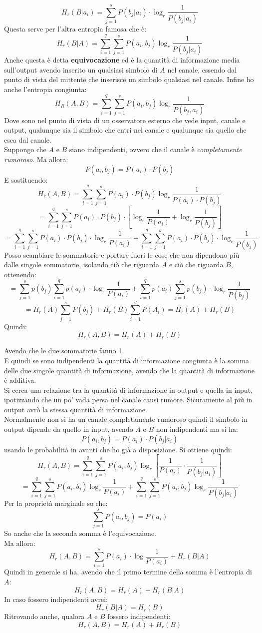 \documentclass[a4paper,12pt, oneside]{book}
\begin{document}
\[H_r(B|a_i)=\sum_{j=1}^s P(b_j|a_i)\cdot \log_r\frac{1}{P(b_j|a_i)}\]
Questa serve per l'altra entropia famosa che è:
\[H_r(B|A)=\sum_{i=1}^q\sum_{j=1}^s P(a_i,b_j)\log_r\frac{1}{P(b_j|a_i)}\]
Anche questa è detta \textbf{equivocazione} ed è la quantità di informazione
media sull'output avendo inserito un qualsiasi simbolo di $A$ nel canale,
essendo dal punto di vista del mittente che inserisce un simbolo qualsiasi nel
canale. 
Infine ho anche l'entropia congiunta:
\[H_R(A,B)=\sum_{i=1}^q\sum_{j=1}^s P(a_i,b_j)\log_r\frac{1}{P(b_j,a_i)}\]
Dove sono nel punto di vista di un osservatore esterno che vede input, canale e
output, qualunque sia il simbolo che entri nel canale e qualunque sia quello che
esca dal canale. \\
Suppongo che $A$ e $B$ siano indipendenti, ovvero che il canale è
\textit{completamente rumoroso}. Ma allora: 
\[P(a_i,b_j)=P(a_i)\cdot P(b_j)\]
E sostituendo:
\[H_r(A,B)=\sum_{i=1}^q\sum_{j=1}^s P(a_i)\cdot
  P(b_j)\log_r\frac{1}{P(a_i)\cdot P(b_j)}\]
\[=\sum_{i=1}^q\sum_{j=1}^s P(a_i)\cdot
  P(b_j)\cdot \left[\log_r\frac{1}{P(a_i)}+\log_r\frac{1}{P(b_j)}\right]\]
\[=\sum_{i=1}^q\sum_{j=1}^s P(a_i)\cdot
  P(b_j)\cdot \log_r\frac{1}{P(a_i)}+\sum_{i=1}^q\sum_{j=1}^s P(a_i)\cdot
  P(b_j)\cdot \log_r\frac{1}{P(b_j)}\]
Posso scambiare le sommatorie e portare fuori le cose che non dipendono più
dalle singole sommatorie, isolando ciò che riguarda $A$ e ciò che riguarda $B$,
ottenendo: 
\[=\sum_{j=1}^sp(b_j)\sum_{i=1}^qp(a_i)\cdot
  \log_r\frac{1}{P(a_i)}+\sum_{i=1}^qp(a_i)\sum_{j=1}^sp(b_j)\cdot
  \log_r\frac{1}{P(b_j)}\]
\[=H_r(A)\sum_{j=1}^sP(b_j)+H_r(B)\sum_{i=1}^qP(A_i)=H_r(A)+H_r(B)\]
Quindi:
\[H_r(A,B)=H_r(A)+H_r(B)\]

Avendo che le due sommatorie fanno 1.\\
E quindi se sono indipendenti la quantità di informazione congiunta è la somma
delle due singole quantità di informazione, avendo che la quantità di
informazione è additiva.\\
Si cerca una relazione tra la quantità di informazione in output e quella in
input, ipotizzando che un po' vada persa nel canale causi rumore. Sicuramente al
più in output avrò la stessa quantità di informazione. \\
Normalmente non si ha un canale completamente rumoroso quindi il simbolo in
output dipende da quello in input, avendo $A$ e $B$ non indipendenti ma si ha:
\[P(a_i,b_j)=P(a_i)\cdot P(b_j|a_i)\]
usando le probabilità in avanti che ho già a disposizione. Si ottiene quindi:
\[H_r(A,B)=\sum_{i=1}^q\sum_{j=1}^s P(a_i,b_j)\log_r\left[\frac{1}{P(a_i)}\cdot
    \frac{1}{P(b_j|a_i)}\right]\]
\[=\sum_{i=1}^q\sum_{j=1}^s
  P(a_i,b_j)\log_r\frac{1}{P(a_i)}+\sum_{i=1}^q\sum_{j=1}^s
  P(a_i,b_j)\log_r\frac{1}{P(b_j|a_i)}\]
Per la proprietà marginale so che:
\[\sum_{j=1}^s P(a_i,b_j)=P(a_i)\]
So anche che la seconda somma è l'equivocazione.\\
Ma allora:
\[H_r(A,B)=\sum_{i=1}^s P(a_i)\cdot \log\frac{1}{P(a_i)}+H_r(B|A)\]
Quindi in generale si ha, avendo che il primo termine della somma è l'entropia
di $A$:
\[H_r(A,B)=H_r(A)+H_r(B|A)\]
In caso fossero indipendenti avrei:
\[H_r(B|A)=H_r(B)\]
Ritrovando anche, qualora $A$ e $B$ fossero indipendenti:
\[H_r(A,B)=H_r(A)+H_r(B)\]
\end{document}
